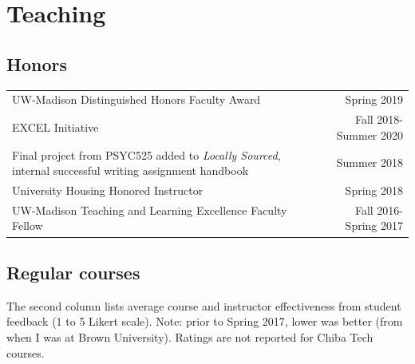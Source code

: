 \documentclass[a4paper,10pt]{article}
\begin{document}
\section{Teaching}
\subsection{Honors}

\begin{tabu}{Xr}
UW-Madison Distinguished Honors Faculty Award & Spring 2019 \\
EXCEL Initiative & Fall 2018-Summer 2020 \\
Final project from PSYC525 added to {\em Locally Sourced}, internal successful writing assignment handbook & Summer 2018 \\
University Housing Honored Instructor & Spring 2018 \\
UW-Madison Teaching and Learning Excellence Faculty Fellow & Fall 2016-Spring 2017  
\end{tabu}

\subsection{Regular courses}
The second column lists average course and instructor effectiveness from student feedback (1 to 5 Likert scale). Note: prior to Spring 2017, lower was better (from when I was at Brown University). Ratings are not reported for Chiba Tech courses. \\
\end{document}
